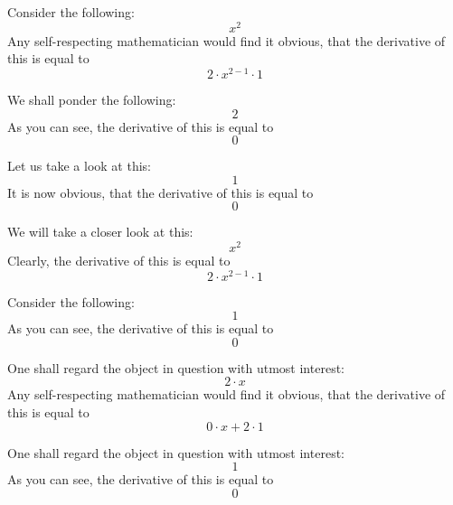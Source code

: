 \documentclass{article}
\begin{document}
Consider the following:
\begin{equation}
x ^{2 } 
\end{equation}
Any self-respecting mathematician would find it obvious, that the derivative of this is equal to
\begin{equation}
2 \cdot x ^{2 - 1 } \cdot 1 
\end{equation}

We shall ponder the following:
\begin{equation}
2 
\end{equation}
As you can see, the derivative of this is equal to
\begin{equation}
0 
\end{equation}

Let us take a look at this:
\begin{equation}
1 
\end{equation}
It is now obvious, that the derivative of this is equal to
\begin{equation}
0 
\end{equation}

We will take a closer look at this:
\begin{equation}
x ^{2 } 
\end{equation}
Clearly, the derivative of this is equal to
\begin{equation}
2 \cdot x ^{2 - 1 } \cdot 1 
\end{equation}

Consider the following:
\begin{equation}
1 
\end{equation}
As you can see, the derivative of this is equal to
\begin{equation}
0 
\end{equation}

One shall regard the object in question with utmost interest:
\begin{equation}
2 \cdot x 
\end{equation}
Any self-respecting mathematician would find it obvious, that the derivative of this is equal to
\begin{equation}
0 \cdot x + 2 \cdot 1 
\end{equation}

One shall regard the object in question with utmost interest:
\begin{equation}
1 
\end{equation}
As you can see, the derivative of this is equal to
\begin{equation}
0 
\end{equation}
\end{document}
